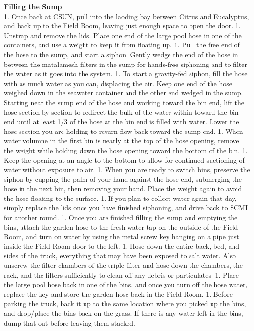 \documentclass[]{book}
\begin{document}
 \textbf{Filling the Sump}\\
1. Once back at CSUN, pull into the laoding bay between Citrus and
Eucalyptus, and back up to the Field Room, leaving just enough space to
open the door. 1. Unstrap and remove the lids. Place one end of the
large pool hose in one of the containers, and use a weight to keep it
from floating up. 1. Pull the free end of the hose to the sump, and
start a siphon. Gently wedge the end of the hose in between the
matalamesh filters in the sump for hands-free siphoning and to filter
the water as it goes into the system. 1. To start a gravity-fed siphon,
fill the hose with as much water as you can, displacing the air. Keep
one end of the hose weighed down in the seawater container and the other
end wedged in the sump. Starting near the sump end of the hose and
working toward the bin end, lift the hose section by section to redirect
the bulk of the water within toward the bin end until at least 1/3 of
the hose at the bin end is filled with water. Lower the hose section you
are holding to return flow back toward the sump end. 1. When water
volumne in the first bin is nearly at the top of the hose opening,
remove the weight while holding down the hose opening toward the bottom
of the bin. 1. Keep the opening at an angle to the bottom to allow for
continued suctioning of water without exposure to air. 1. When you are
ready to switch bins, preserve the siphon by cupping the palm of your
hand against the hose end, submerging the hose in the next bin, then
removing your hand. Place the weight again to avoid the hose floating to
the surface. 1. If you plan to collect water again that day, simply
replace the lids once you have finished siphoning, and drive back to
SCMI for another round. 1. Once you are finished filling the sump and
emptying the bins, attach the garden hose to the fresh water tap on the
outside of the Field Room, and turn on water by using the metal screw
key hanging on a pipe just inside the Field Room door to the left. 1.
Hose down the entire back, bed, and sides of the truck, everything that
may have been exposed to salt water. Also unscrew the filter chambers of
the triple filter and hose down the chambers, the rack, and the filters
sufficiently to clean off any debris or particulates. 1. Place the large
pool hose back in one of the bins, and once you turn off the hose water,
replace the key and store the garden hose back in the Field Room. 1.
Before parking the truck, back it up to the same location where you
picked up the bins, and drop/place the bins back on the grass. If there
is any water left in the bins, dump that out before leaving them
stacked.
\end{document}
